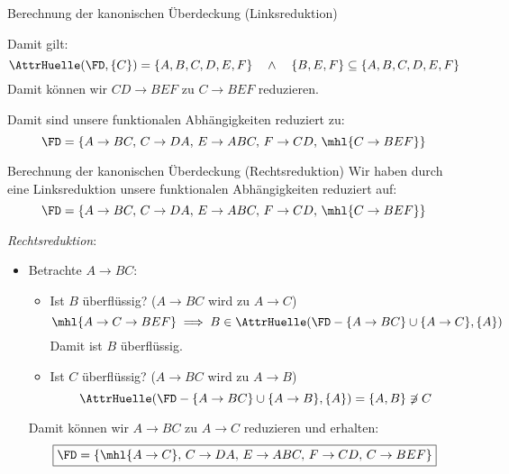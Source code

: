 \begin{example}{Berechnung der kanonischen Überdeckung (Linksreduktion)}
\begin{itemize}
              Damit gilt:
              \[
                  \AttrHuelle(\FD, \{C\}) = \{ A, B, C, D, E, F \} \quad \land \quad \{ B, E, F \} \subseteq \{ A, B, C, D, E, F \}
              \]
              Damit können wir $CD \to BEF$ zu $C \to BEF$ reduzieren.
    \end{itemize}

    Damit sind unsere funktionalen Abhängigkeiten reduziert zu:
    \[
        \FD = \{
        A \to BC, \,
        C \to DA, \,
        E \to ABC, \,
        F \to CD, \,
        \mhl{C \to BEF}
        \}
    \]
\end{example}

\begin{example}{Berechnung der kanonischen Überdeckung (Rechtsreduktion)}
    Wir haben durch eine Linksreduktion unsere funktionalen Abhängigkeiten reduziert auf:
    \[
        \FD = \{
        A \to BC, \,
        C \to DA, \,
        E \to ABC, \,
        F \to CD, \,
        \mhl{C \to BEF}
        \}
    \]

    \emph{Rechtsreduktion}:

    \begin{itemize}
        \item Betrachte $A \to BC$:
              \begin{itemize}
                  \item Ist $B$ überflüssig? ($A \to BC$ wird zu $A \to C$)
                        \[
                            \mhl{A \to C \to BEF} \implies B \in \AttrHuelle(\FD - \{ A \to BC \} \cup \{ A \to C \}, \{A\})
                        \]
                        Damit ist $B$ überflüssig.
                  \item Ist $C$ überflüssig? ($A \to BC$ wird zu $A \to B$)
                        \[
                            \AttrHuelle(\FD - \{ A \to BC \} \cup \{ A \to B \}, \{A\}) = \{ A, B \} \not\ni C
                        \]
              \end{itemize}
              Damit können wir $A \to BC$ zu $A \to C$ reduzieren und erhalten:
              \[
                  \boxed{
                      \FD = \{
                      \mhl{A \to C}, \,
                      C \to DA, \,
                      E \to ABC, \,
                      F \to CD, \,
                      C \to BEF
                      \}
                  }
              \]


\end{itemize}
\end{example}
